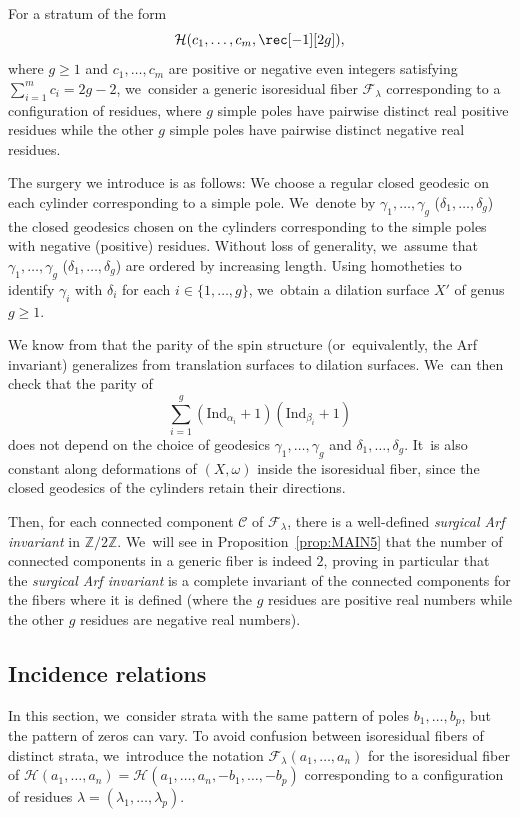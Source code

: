 \documentclass[JEP,XML,SOM,Unicode,NoFloatCountersInSection,published]{cedram}
\theoremstyle{definition}
\begin{document}
For a stratum of the form
\[
\mathcal{H}(c_{1},\dots,c_{m},\rec[-1][2g]),
\]
where $g\geq 1$ and $c_{1},\dots,c_{m}$ are positive or negative even integers satisfying $\sum_{i=1}^m c_{i} = 2g-2$, we~consider a generic isoresidual fiber $\mathcal{F}_{\lambda}$ corresponding to a configuration of residues, where $g$ simple poles have pairwise distinct real positive residues while the other $g$ simple poles have pairwise distinct negative real residues.

The surgery we introduce is as follows: We choose a regular closed geodesic on each cylinder corresponding to a simple pole. We~denote by $\gamma_{1},\dots,\gamma_{g}$ (\resp $\delta_{1},\dots,\delta_{g}$) the closed geodesics chosen on the cylinders corresponding to the simple poles with negative (\resp positive) residues. Without loss of generality, we~assume that $\gamma_{1},\dots,\gamma_{g}$ (\resp $\delta_{1},\dots,\delta_{g}$) are ordered by increasing length. Using homotheties to identify $\gamma_{i}$ with $\delta_{i}$ for each $i \in \lbrace{ 1,\dots,g \rbrace}$, we~obtain a dilation surface $X'$ of genus $g \geq 1$.

We know from \cite{ABW,Kawazumi} that the parity of the spin structure (or~equivalently, the Arf invariant) generalizes from translation surfaces to dilation surfaces. We~can then check that the parity of
\[
\sum_{i=1}^{g} (\mathrm{Ind}_{\alpha_{i}}+1)(\mathrm{Ind}_{\beta_{i}}+1)
\]
does not depend on the choice of geodesics $\gamma_{1},\dots,\gamma_{g}$ and $\delta_{1},\dots,\delta_{g}$. It~is also constant along deformations of $(X,\omega)$ inside the isoresidual fiber, since the closed geodesics of the cylinders retain their directions.

Then, for each connected component $\mathcal{C}$ of $\mathcal{F}_{\lambda}$, there is a well-defined \textit{surgical Arf invariant} in $\mathbb{Z}/2\mathbb{Z}$. We~will see in Proposition~\ref{prop:MAIN5} that the number of connected components in a generic fiber is indeed $2$, proving in particular that the \textit{surgical Arf invariant} is a complete invariant of the connected components for the fibers where it is defined (where the $g$ residues are positive real numbers while the other $g$ residues are negative real numbers).

\subsection{Incidence relations}\label{sub:Incidence}

In this section, we~consider strata with the same pattern of poles $b_{1},\dots,b_{p}$, but the pattern of zeros can vary. To avoid confusion between isoresidual fibers of distinct strata, we~introduce the notation $\mathcal{F}_{\lambda}(a_{1},\dots,a_{n})$ for the isoresidual fiber of $\mathcal{H}(a_{1},\dots,a_{n}) =
\mathcal{H}(a_{1},\dots,a_{n}, -b_1,\ldots, -b_p)$ corresponding to a configuration of residues $\lambda=(\lambda_{1},\dots,\lambda_{p})$.
\end{document}
